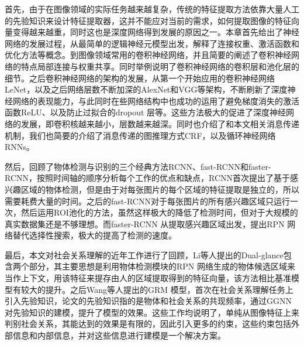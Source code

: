 首先，由于在图像领域的实际任务越来越复杂，传统的特征提取方法依靠大量人工的先验知识来设计特征提取器，这并不能应对当前的需求，如何提取图像的特征向量变得越来越重，同时这也是深度网络得到发展的原因之一。本章首先给出了神经网络的发展过程，从最简单的逻辑神经元模型出发，解释了连接权重、激活函数和优化方法等概念。到图像领域常用的卷积神经网络，并且简要的阐述了卷积神经网络的特点局部连接与权重共享。同时举例说明了卷积神经网络的卷积层和池化层的细节。之后卷积神经网络的架构的发展，从第一个开始应用的卷积神经网络LeNet，以及之后网络层数不断加深的AlexNet和VGG等架构，不断刷新了深度神经网络的表现能力，与此同时在些网络结构中也成功的运用了避免梯度消失的激活函数ReLU、以及防止过拟合的dropout 层等。这些方法极大的促进了深度神经网络的发展，即卷积核越来越小，层数越来越深。同时也介绍了和本文相关消息传递机制，我们也简要的介绍了消息传递的图推理方式CRF，以及循环神经网络RNNs。

然后，回顾了物体检测与识别的三个经典方法RCNN、fast-RCNN和faster-RCNN，按照时间轴的顺序分析每个工作的优点和缺点，RCNN首次提出了基于感兴趣区域的物体检测，但是由于对每张图片的每个区域的特征提取是独立的，所以需要耗费大量的时间。之后的fast-RCNN对于每张图片的所有感兴趣区域只运行一次，然后运用ROI池化的方法，虽然这样极大的降低了检测时间，但对于大规模的真实数据集还是不够理想。而faster-RCNN 从提取感兴趣区域出发，提出RPN 网络替代选择性搜索，极大的提高了检测的速度。

最后，本文对社会关系理解的近年工作进行了回顾，Li等人提出的Dual-glance包含两个部分，其主要思想是利用物体检测模块的RPN 网络生成的物体候选区域来当作上下文，用该特征来提存由人的区域提取得到的特征向量，该方法相比基准模型有较大的提升。之后Wang等人提出的GRM 模型，首次在社会关系理解任务上引入先验知识，论文的先验知识指的是物体和社会关系的共现频率，通过GGNN对先验知识的建模，提升了模型的效果。这些工作均说明了，单纯从图像特征上来判别社会关系，其能达到的效果是有限的，因此引入更多的约束，这些约束包括外部信息和内部信息，并对这些信息进行建模是一个解决方案。







